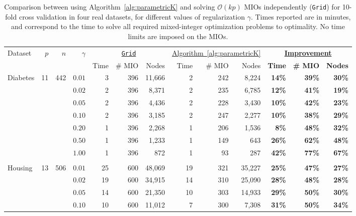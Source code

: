 \documentclass[mnsc,nonblindrev]{informs3} %
\begin{document}
\begin{center}
	\begin{table}[h!]\footnotesize
 \caption{Comparison between using Algorithm~\ref{alg:parametricK} and solving $\mathcal{O}(kp)$ MIOs independently (\texttt{Grid}) for 10-fold cross validation in four real datasets, for different values of regularization $\gamma$. Times reported are in minutes, and correspond to the time to solve all required mixed-integer optimization problems to optimality. No time limits are imposed on the MIOs.}
 \label{tab:gridVsAlg10}
	\setlength{\tabcolsep}{2pt}
	\begin{tabular}{l r r r|r r r | r r r  | r r r }
		
		\hline
		\multirow{2}{*}{Dataset}&\multirow{2}{*}{$p$}&\multirow{2}{*}{$n$}&\multirow{2}{*}{$\gamma$}& \multicolumn{3}{c|}{\underline{\texttt{Grid}}}&\multicolumn{3}{c|}{\underline{Algorithm~\ref{alg:parametricK}}}&\multicolumn{3}{c}{\textbf{\underline{Improvement}}}\\
		&&&&Time&\# MIO&Nodes&Time&\# MIO&Nodes&\textbf{Time}&\textbf{\# MIO}&\textbf{Nodes}\\
		\hline
			\multirow{7}{*}{Diabetes}&\multirow{7}{*}{11}&\multirow{7}{*}{442}&
		$0.01$&3&396&11,666&2&242&8,224&\textbf{14\%}&\textbf{39\%}&\textbf{30\%}\\
		&&&$0.02$&2&396&8,371&2&235&6,785&\textbf{12\%}&\textbf{41\%}&\textbf{19\%}\\
		&&&$0.05$&2&396&4,436&2&228&3,430&\textbf{10\%}&\textbf{42\%}&\textbf{23\%}\\
		&&&$0.10$&2&396&3,185&2&247&2,277&\textbf{10\%}&\textbf{38\%}&\textbf{29\%}\\
		&&&$0.20$&1&396&2,268&1&206&1,536&\textbf{8\%}&\textbf{48\%}&\textbf{32\%}\\
		&&&$0.50$&1&396&1,233&1&149&643&\textbf{26\%}&\textbf{62\%}&\textbf{48\%}\\
		&&&$1.00$&1&396&872&1&93&287&\textbf{42\%}&\textbf{77\%}&\textbf{67\%}\\
		&&&&&&&&&&&&\\
		\multirow{7}{*}{Housing}&\multirow{7}{*}{13}&\multirow{7}{*}{506}&
		$0.01$&25&600&48,069&19&321&35,227&\textbf{25\%}&\textbf{47\%}&\textbf{27\%}\\
		&&&$0.02$&19&600&34,915&14&310&25,090&\textbf{28\%}&\textbf{48\%}&\textbf{28\%}\\
		&&&$0.05$&14&600&21,350&10&303&14,933&\textbf{29\%}&\textbf{50\%}&\textbf{30\%}\\
		&&&$0.10$&10&600&11,012&7&300&7,308&\textbf{31\%}&\textbf{50\%}&\textbf{34\%}\\

\end{tabular}
\end{table}
\end{center}
\end{document}
